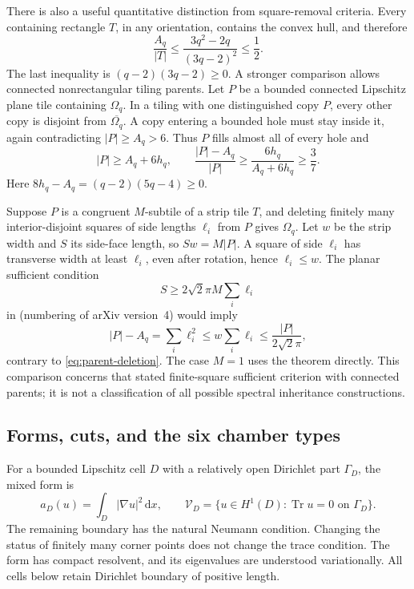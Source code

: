 \documentclass[11pt,reqno]{amsart}
\numberwithin{equation}{section}
\newcommand{\dd}{\,\mathrm d}
\newcommand{\abs}[1]{\lvert#1\rvert}
\newcommand{\Om}{\Omega}
\begin{document}
There is also a useful quantitative distinction from square-removal
criteria. Every containing rectangle $T$, in any orientation, contains
the convex hull, and therefore
\begin{equation}\label{eq:retained-fraction}
 \frac{A_q}{|T|}\le
 \frac{3q^2-2q}{(3q-2)^2}\le\frac12.
\end{equation}
The last inequality is $(q-2)(3q-2)\ge0$. A stronger comparison
allows connected nonrectangular tiling parents. Let $P$ be a bounded
connected Lipschitz plane tile containing $\Om_q$. In a tiling with
one distinguished copy $P$, every other copy is disjoint from
$\overline{\Om_q}$. A copy entering a bounded hole must stay inside
it, again contradicting $|P|\ge A_q>6$. Thus $P$ fills almost all of
every hole and
\begin{equation}\label{eq:parent-deletion}
 |P|\ge A_q+6h_q,\qquad
 \frac{|P|-A_q}{|P|}
 \ge\frac{6h_q}{A_q+6h_q}\ge\frac37.
\end{equation}
Here $8h_q-A_q=(q-2)(5q-4)\ge0$.

Suppose $P$ is a congruent $M$-subtile of a strip tile $T$,
and deleting finitely many interior-disjoint squares of side
lengths $\ell_i$ from $P$ gives $\Om_q$. Let $w$ be the strip
width and $S$ its side-face length, so $Sw=M|P|$. A square of
side $\ell_i$ has transverse width at least $\ell_i$, even
after rotation, hence $\ell_i\le w$. The planar sufficient
condition
\[
 S\ge2\sqrt2\pi M\sum_i\ell_i
\]
in \cite[Theorem~1.15 and Corollary~1.16]{JiangLin}
(numbering of arXiv version~4) would imply
\[
 |P|-A_q=\sum_i\ell_i^2
 \le w\sum_i\ell_i\le\frac{|P|}{2\sqrt2\pi},
\]
contrary to \eqref{eq:parent-deletion}.
The case $M=1$ uses the theorem directly.
This comparison concerns that stated finite-square sufficient
criterion with connected parents; it is not a classification
of all possible spectral inheritance constructions.

\subsection{Forms, cuts, and the six chamber types}

For a bounded Lipschitz cell $D$ with a relatively open
Dirichlet part $\Gamma_D$, the mixed form is
\[
 a_D(u)=\int_D\abs{\nabla u}^2\dd x,
 \qquad
 \mathcal V_D=\{u\in H^1(D):\operatorname{Tr}u=0
                  \text{ on }\Gamma_D\}.
\]
The remaining boundary has the natural Neumann condition.
Changing the status of finitely many corner points does not
change the trace condition. The form has compact resolvent,
and its eigenvalues are understood variationally. All cells
below retain Dirichlet boundary of positive length.
\end{document}
